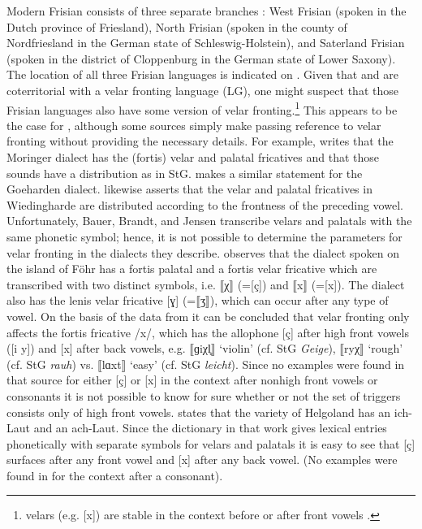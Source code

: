 Modern Frisian consists of three separate branches \citep{Walker1989}: West Frisian (spoken in the Dutch province of Friesland), North Frisian (spoken in the county of Nordfriesland in the German state of Schleswig-Holstein), and Saterland Frisian (spoken in the district of Cloppenburg in the German state of Lower Saxony). The location of all three Frisian languages is indicated on . Given that  and  are coterritorial with a velar fronting language (LG), one might suspect that those Frisian languages also have some version of velar fronting.\footnote{ velars (e.g. [x]) are stable in the context before or after front vowels \citep{Sipma1913, CohenEbelingeringafokkemaholk1959, Hoekstra2001}.} This appears to be the case for , although some sources simply make passing reference to velar fronting without providing the necessary details. For example, \citet[25]{Bauer1925} writes that the Moringer dialect has the (fortis) velar and palatal fricatives and that those sounds have a distribution as in StG. \citet[43]{Brandt1913} makes a similar statement for the Goeharden dialect. \citet[44--45]{Jensen1925} likewise asserts that the velar and palatal fricatives in Wiedingharde are distributed according to the frontness of the preceding vowel. Unfortunately, Bauer, Brandt, and Jensen transcribe velars and palatals with the same phonetic symbol; hence, it is not possible to determine the parameters for velar fronting in the dialects they describe. \citet[20]{Tedsen1906} observes that the  dialect spoken on the island of Föhr has a fortis palatal and a fortis velar fricative which are transcribed with two distinct symbols, i.e. ⟦χ⟧ (=[ç]) and ⟦x⟧ (=[x]). The dialect also has the lenis velar fricative [ɣ] (=⟦ʒ⟧), which can occur after any type of vowel. On the basis of the data from \citet{Tedsen1906} it can be concluded that velar fronting only affects the fortis fricative /x/, which has the allophone [ç] after high front vowels ([i y]) and [x] after back vowels, e.g. ⟦ɡiχl̥⟧ ‘violin’ (cf. StG \textit{Geige}), ⟦ryχ⟧ ‘rough’ (cf. StG \textit{rauh}) vs. ⟦lɑxt⟧ ‘easy’ (cf. StG \textit{leicht}). Since no examples were found in that source for either [ç] or [x] in the context after nonhigh front vowels or consonants it is not possible to know for sure whether or not the set of triggers consists only of high front vowels. \citet[176]{Siebs1909} states that the  variety of Helgoland has an ich-Laut and an ach-Laut. Since the dictionary in that work gives lexical entries phonetically with separate symbols for velars and palatals it is easy to see that [ç] surfaces after any front vowel and [x] after any back vowel. (No examples were found in \citealt{Siebs1909} for the context after a consonant).  

